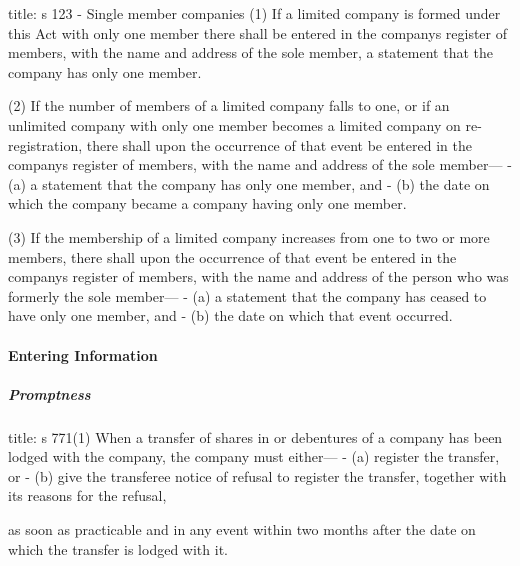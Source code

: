 \documentclass[
]{article}
\newenvironment{Shaded}{}{}
\newcommand{\NormalTok}[1]{#1}
\begin{document}
\begin{Shaded}
\begin{Highlighting}[]
\NormalTok{title: s 123 {-} Single member companies}
\NormalTok{(1) If a limited company is formed under this Act with only one member there shall be entered in the company\textquotesingle{}s register of members, with the name and address of the sole member, a statement that the company has only one member.}

\NormalTok{(2) If the number of members of a limited company falls to one, or if an unlimited company with only one member becomes a limited company on re{-}registration, there shall upon the occurrence of that event be entered in the company\textquotesingle{}s register of members, with the name and address of the sole member—}
\NormalTok{{-} (a) a statement that the company has only one member, and}
\NormalTok{{-} (b) the date on which the company became a company having only one member.}

\NormalTok{(3) If the membership of a limited company increases from one to two or more members, there shall upon the occurrence of that event be entered in the company\textquotesingle{}s register of members, with the name and address of the person who was formerly the sole member—}
\NormalTok{{-} (a) a statement that the company has ceased to have only one member, and}
\NormalTok{{-} (b) the date on which that event occurred.}
\end{Highlighting}
\end{Shaded}

\hypertarget{entering-information}{%
\paragraph{Entering Information}\label{entering-information}}

\hypertarget{promptness}{%
\subparagraph{Promptness}\label{promptness}}

\begin{Shaded}
\begin{Highlighting}[]
\NormalTok{title: s 771(1)}
\NormalTok{When a transfer of shares in or debentures of a company has been lodged with the company, the company must either—}
\NormalTok{{-} (a) register the transfer, or}
\NormalTok{{-} (b) give the transferee notice of refusal to register the transfer, together with its reasons for the refusal,}

\NormalTok{as soon as practicable and in any event within two months after the date on which the transfer is lodged with it. }
\end{Highlighting}
\end{Shaded}
\end{document}
